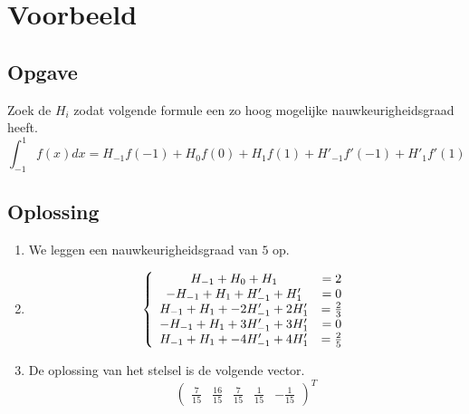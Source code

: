 \documentclass[12pt,a4paper]{article}
\begin{document}
\section{Voorbeeld}
\subsection{Opgave}
Zoek de $H_i$ zodat volgende formule een zo hoog mogelijke nauwkeurigheidsgraad heeft.
\[
\int_{-1}^{1}f(x)dx = H_{-1}f(-1) + H_0f(0) + H_1f(1) + H'_{-1}f'(-1) + H'_1f'(1)
\]

\subsection{Oplossing}
\begin{enumerate}
\item We leggen een nauwkeurigheidsgraad van $5$ op.

\item 
\[
\left\{
\begin{array}{c c}
H_{-1} + H_0 + H_1  &= 2\\
-H_{-1} + H_1 + H'_{-1} + H'_1 &= 0\\
H_{-1} + H_1 + -2H'_{-1} + 2H'_1 &= \frac{2}{3}\\
-H_{-1} + H_1 + 3H'_{-1} + 3H'_1 &= 0\\
H_{-1} + H_1 + -4H'_{-1} + 4H'_1 &= \frac{2}{5}\\
\end{array}
\right.
\]

\item 
De oplossing van het stelsel is de volgende vector.
\[
\begin{pmatrix}
\frac{7}{15}&
\frac{16}{15}&
\frac{7}{15}&
\frac{1}{15}&
-\frac{1}{15}
\end{pmatrix}^{T}
\]
\end{enumerate}
\end{document}
